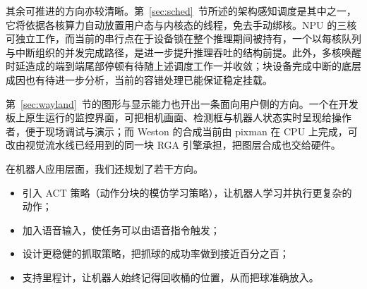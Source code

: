 \documentclass[11pt,a4paper]{ctexart}
\begin{document}
其余可推进的方向亦较清晰。第~\ref{sec:sched}~节所述的架构感知调度是其中之一，它将依据各核算力自动放置用户态与内核态的线程，免去手动绑核。NPU 的三核可独立工作，而当前的串行点在于设备锁在整个推理期间被持有，一个以每核队列与中断组织的并发完成路径，是进一步提升推理吞吐的结构前提。此外，多核唤醒时延造成的端到端尾部停顿有待随上述调度工作一并收敛；块设备完成中断的底层成因也有待进一步分析，当前的容错处理已能保证稳定挂载。

第~\ref{sec:wayland}~节的图形与显示能力也开出一条面向用户侧的方向。一个在开发板上原生运行的监控界面，可把相机画面、检测框与机器人状态实时呈现给操作者，便于现场调试与演示；而 Weston 的合成当前由 pixman 在 CPU 上完成，可改由视觉流水线已经用到的同一块 RGA 引擎承担，把图层合成也交给硬件。

在机器人应用层面，我们还规划了若干方向。
\begin{itemize}
\item 引入 ACT 策略（动作分块的模仿学习策略），让机器人学习并执行更复杂的动作；
\item 加入语音输入，使任务可以由语音指令触发；
\item 设计更稳健的抓取策略，把抓球的成功率做到接近百分之百；
\item 支持里程计，让机器人始终记得回收桶的位置，从而把球准确放入。
\end{itemize}
\end{document}
